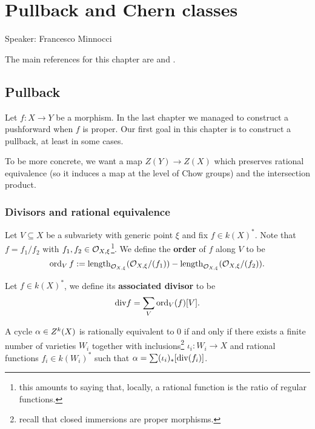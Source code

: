 \chapter{Pullback and Chern classes}
\begin{center}
	{\huge Speaker: Francesco Minnocci}
\end{center}
\bigskip

\noindent
The main references for this chapter are \cite{fulton1984intersection} and \cite{eisenbud20163264}. 



\section{Pullback}

Let $f:X\to Y$ be a morphism. In the last chapter we managed to construct a pushforward when $f$ is proper. Our first goal in this chapter is to construct a pullback, at least in some cases.


To be more concrete, we want a map $Z(Y)\to Z(X)$ which preserves rational equivalence (so it induces a map at the level of Chow groups) and the intersection product.

\subsection{Divisors and rational equivalence}
\begin{definition}[]
Let $V\subseteq X$ be a subvariety with generic point $\xi$ and fix $f\in k(X)^\ast$. Note that $f=f_1/f_2$ with $f_1,f_2\in \mathcal{O}_{X,\xi}$\footnote{this amounts to saying that, locally, a rational function is the ratio of regular functions.}. We define the \textbf{order} of $f$ along $V$ to be
\[\operatorname{ord}_Vf:=\operatorname{length}_{\mathcal{O}_{X,\xi}}(\mathcal{O}_{X,\xi}/(f_1))-\operatorname{length}_{\mathcal{O}_{X,\xi}}(\mathcal{O}_{X,\xi}/(f_2)).\]
\end{definition}


\begin{definition}[]
Let $f\in k(X)^\ast$, we define its \textbf{associated divisor} to be
\[\mathrm{div} f=\sum_V\operatorname{ord}_V(f)[V].\]
\end{definition}


\begin{proposition}[]
A cycle $\alpha\in Z^k(X)$ is rationally equivalent to $0$ if and only if there exists a finite number of varieties $W_i$ together with inclusions\footnote{recall that closed immersions are proper morphisms.} $\iota_i:W_i\to X$ and rational functions $f_i\in k(W_i)^\ast$ such that $\alpha=\sum (\iota_i)_\ast[\mathrm{div}(f_i)]$.
\end{proposition}

